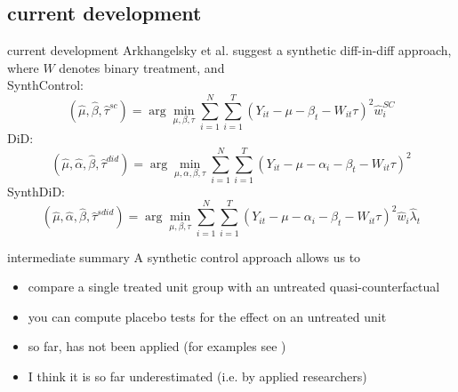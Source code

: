 \documentclass[aspectratio=169]{beamer}
\begin{document}
	\subsection{current development}
		\begin{frame}{current development}
			Arkhangelsky et al. \citeyear{Arkhangelsky2019} suggest a synthetic diff-in-diff approach, where $W$ denotes binary treatment, and\\ \vspace*{.15cm}
			SynthControl:
			\begin{equation}
				(\hat{\mu}, \hat{\beta}, \hat{\tau}^{sc}) = \arg\min_{\mu, \beta, \tau}  \sum_{i=1}^{N} \sum_{i=1}^{T} \left(Y_{it} - \mu - \beta_t - W_{it}\tau \right)^2 \hat{w}_i^{SC}
			\end{equation}
			DiD:
			\begin{equation}
				(\hat{\mu}, \hat{\alpha}, \hat{\beta}, \hat{\tau}^{did}) = \arg\min_{\mu, \alpha, \beta, \tau}  \sum_{i=1}^{N} \sum_{i=1}^{T} \left(Y_{it} - \mu - \alpha_i -\beta_t - W_{it}\tau \right)^2
			\end{equation}
			SynthDiD:
			\begin{equation}
				(\hat{\mu}, \hat{\alpha}, \hat{\beta}, \hat{\tau}^{sdid}) = \arg\min_{\mu, \beta, \tau}  \sum_{i=1}^{N} \sum_{i=1}^{T} \left(Y_{it} - \mu - \alpha_i -\beta_t - W_{it}\tau \right)^2 \hat{w}_i \hat{\lambda}_t
			\end{equation}
		\end{frame}

		\begin{frame}{intermediate summary}
			A synthetic control approach allows us to \\ \vspace*{.5cm}
			\begin{itemize}
				\item compare a single treated unit group with an untreated quasi-counterfactual
				\item you can compute placebo tests for the effect on an untreated unit
				\item so far, has not been  applied (for examples see \cite{Abadie2020})
				\item I think it is so far underestimated (i.e. by applied researchers)
			\end{itemize}
		\end{frame}
\end{document}
